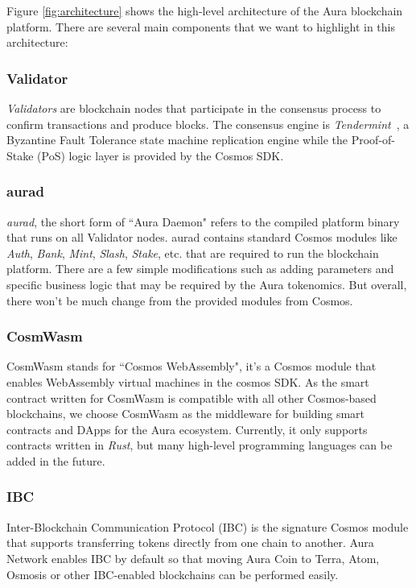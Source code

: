 \documentclass[11pt, titlepage]{article}
\begin{document}
Figure \ref{fig:architecture} shows the high-level architecture of the Aura blockchain platform. There are several main components that we want to highlight in this architecture:

\subsubsection*{Validator}
\emph{Validators} are blockchain nodes that participate in the consensus process to confirm transactions and produce blocks.
The consensus engine is \emph{Tendermint}~\cite{buchman2016tendermint}, a Byzantine Fault Tolerance state machine replication engine while the Proof-of-Stake (PoS) logic layer is provided by the Cosmos SDK. 

\subsubsection*{aurad}
\emph{aurad}, the short form of ``Aura Daemon" refers to the compiled platform binary that runs on all Validator nodes. aurad contains standard Cosmos modules like \emph{Auth}, \emph{Bank}, \emph{Mint}, \emph{Slash}, \emph{Stake}, etc. that are required to run the blockchain platform. There are a few simple modifications such as adding parameters and specific business logic that may be required by the Aura tokenomics. But overall, there won't be much change from the provided modules from Cosmos.

\subsubsection*{CosmWasm}
CosmWasm stands for ``Cosmos WebAssembly", it's a Cosmos module that enables WebAssembly virtual machines in the cosmos SDK. As the smart contract written for CosmWasm is compatible with all other Cosmos-based blockchains, we choose CosmWasm as the middleware for building smart contracts and DApps for the Aura ecosystem. Currently, it only supports contracts written in \emph{Rust}, but many high-level programming languages can be added in the future.

\subsubsection*{IBC}
Inter-Blockchain Communication Protocol (IBC) is the signature Cosmos module that supports transferring tokens directly from one chain to another. Aura Network enables IBC by default so that moving Aura Coin to Terra, Atom, Osmosis or other IBC-enabled blockchains can be performed easily.
\end{document}

